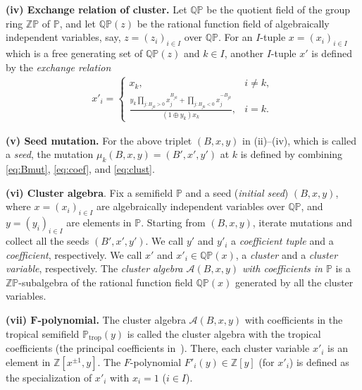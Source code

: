 \documentclass[11pt]{article}
\numberwithin{equation}{section}
\theoremstyle{definition}
\begin{document}
{\bf (iv)   Exchange relation of cluster.}
Let $\mathbb{QP}$ be the  quotient f\/ield of the group ring
$\mathbb{Z}\mathbb{P}$ of $\mathbb{P}$,
 and let $\mathbb{QP}(z)$ be the rational function f\/ield of
algebraically independent variables, say, $z=(z_i)_{i\in I}$
over $\mathbb{QP}$.
For an $I$-tuple $x=(x_i)_{i\in I}$ which
is a free generating set of $\mathbb{QP}(z)$
and $k\in I$, another $I$-tuple $x'$ is def\/ined
by the {\em exchange relation}
\begin{gather}
\label{eq:clust}
x'_i =
\begin{cases}
{x_k}, &i\neq k,\\
\displaystyle
\frac{y_k
\prod\limits_{j: B_{jk}>0} x_j^{B_{jk}}
+
\prod\limits_{j: B_{jk}<0} x_j^{-B_{jk}}
}{(1\oplus y_k)x_k},
&
i= k.
\end{cases}
\end{gather}

{\bf (v)  Seed mutation.} For the above triplet $(B,x,y)$
in (ii)--(iv), which is called a {\em seed},  the mutation
$\mu_k(B,x,y)=(B',x',y')$  at $k$ is def\/ined
 by combining \eqref{eq:Bmut}, \eqref{eq:coef},
and \eqref{eq:clust}.

{\bf (vi)  Cluster algebra}. Fix a semif\/ield $\mathbb{P}$
and a seed ({\em initial seed\/}) $(B,x,y)$, where
$x=(x_i)_{i\in I}$  are algebraically independent variables
over $\mathbb{Q}\mathbb{P}$,
and
$y=(y_i)_{i\in I}$  are elements in $\mathbb{P}$.
Starting from $(B,x,y)$, iterate mutations and collect all the
seeds $(B',x',y')$.
We call  $y'$  and $y'_i$ a {\em coefficient tuple} and
a {\em coefficient}, respectively.
We call  $x'$  and $x'_i\in \mathbb{Q}\mathbb{P}(x)$, a {\em cluster} and
a {\em cluster variable}, respectively.
The {\em cluster algebra $\mathcal{A}(B,x,y)$ with
coefficients in $\mathbb{P}$} is a
$\mathbb{Z}\mathbb{P}$-subalgebra of the
rational function f\/ield $\mathbb{Q}\mathbb{P}(x)$
generated by all the cluster variables.


{\bf (vii) $\boldsymbol{F}$-polynomial.}
The cluster algebra $\mathcal{A}(B,x,y)$ with coef\/f\/icients in
the tropical semi\-f\/ield $\mathbb{P}_{\mathrm{trop}}(y)$ is called the
cluster algebra with the tropical coef\/f\/icients
(the principal coef\/f\/icients in~\cite{Fomin07}).
There, each cluster variable $x'_i$ is an element
in $\mathbb{Z}[x^{\pm 1},y]$.
The $F$-polynomial $F'_i(y)\in \mathbb{Z}[y]$ (for $x'_i$)
is def\/ined as the specialization of $x'_i$ with $x_i=1$ ($i\in I$).
\end{document}
